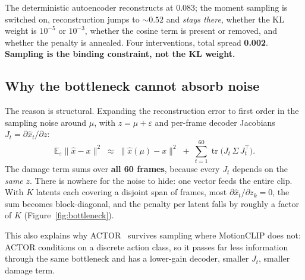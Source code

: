 \documentclass[11pt,a4paper]{report}
\begin{document}
The deterministic autoencoder reconstructs at $0.083$; the moment sampling
is switched on, reconstruction jumps to ${\sim}0.52$ and \emph{stays
there}, whether the KL weight is $10^{-5}$ or $10^{-3}$, whether the cosine
term is present or removed, and whether the penalty is annealed. Four
interventions, total spread \textbf{0.002}. \textbf{Sampling is the binding
constraint, not the KL weight.}

\subsection{Why the bottleneck cannot absorb noise}
\label{sec:bottleneck}

The reason is structural. Expanding the reconstruction error to first order
in the sampling noise around $\mu$, with $z=\mu+\varepsilon$ and per-frame
decoder Jacobians $J_t=\partial\hat x_t/\partial z$:
\begin{equation}
\mathbb E_\varepsilon\lVert \hat x - x\rVert^2
\;\approx\;
\lVert \hat x(\mu)-x\rVert^2
\;+\;
\sum_{t=1}^{60}\operatorname{tr}\!\big(J_t\,\Sigma\,J_t^{\top}\big).
\label{eq:expansion}
\end{equation}
The damage term sums over \textbf{all 60 frames}, because every $J_t$
depends on the \emph{same} $z$. There is nowhere for the noise to hide: one
vector feeds the entire clip. With $K$ latents each covering a disjoint
span of frames, most $\partial\hat x_t/\partial z_k = 0$, the sum becomes
block-diagonal, and the penalty per latent falls by roughly a factor of
$K$ (Figure~\ref{fig:bottleneck}).

This also explains why ACTOR~\cite{petrovich2021actor} survives sampling
where MotionCLIP does not: ACTOR conditions on a discrete action class, so
it passes far less information through the same bottleneck and has a
lower-gain decoder, smaller $J_t$, smaller damage term.
\end{document}
